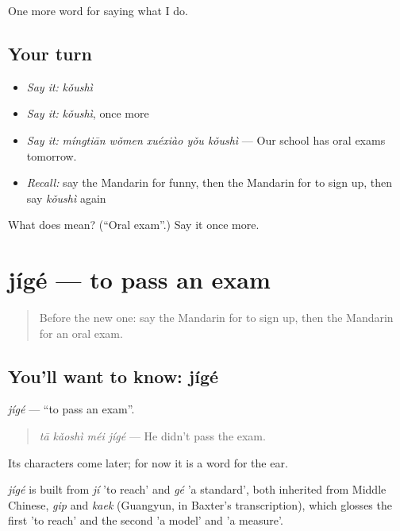 \begin{grammarlens}[title={What you've built}]
One more word for saying what I do.
\end{grammarlens}

\subsection*{Your turn}
\begin{itemize}
\raggedright
  \item \emph{Say it:} \emph{kǒushì}
  \item \emph{Say it:} \emph{kǒushì}, once more
  \item \emph{Say it:} \emph{míngtiān wǒmen xuéxiào yǒu kǒushì} — Our school has oral exams tomorrow.
  \item \emph{Recall:} say the Mandarin for funny, then the Mandarin for to sign up, then say \emph{kǒushì} again
\end{itemize}

\begin{tcolorbox}[breakable,colback=teal!4,colframe=teal!35!black,title={Before you move on}]
What does  mean? (\textquotedblleft{}Oral exam\textquotedblright{}.) Say it once more.
\end{tcolorbox}
\section[jígé]{jígé — to pass an exam}

\label{lesson:ZH-C268-jige}



\begin{quote}
Before the new one: say the Mandarin for to sign up, then the Mandarin for an oral exam.
\end{quote}

\subsection*{You'll want to know: jígé}
\emph{jígé} — \textquotedblleft{}to pass an exam\textquotedblright{}.

\begin{quote}
\emph{tā kǎoshì méi jígé} — He didn't pass the exam.
\end{quote}

Its characters come later; for now it is a word for the ear.

\begin{cousinweb}
\emph{jígé} is built from \emph{jí} 'to reach' and \emph{gé} 'a standard', both inherited from Middle Chinese, \emph{gip} and \emph{kaek} (Guangyun, in Baxter's transcription), which glosses the first 'to reach' and the second 'a model' and 'a measure'.
\end{cousinweb}

